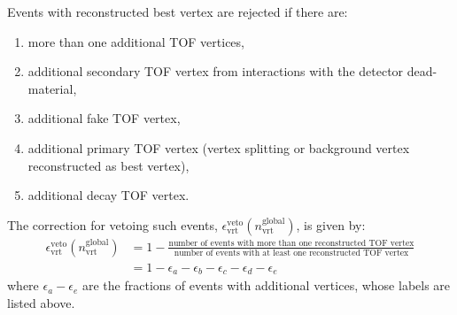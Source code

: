Events with reconstructed best vertex are rejected if there  are:
\begin{enumerate}[label=\alph*)]
	\item more than one additional TOF vertices,
	\item additional secondary TOF vertex from interactions with the detector dead-material,
	\item additional fake TOF vertex,
	\item additional primary TOF vertex (vertex splitting or background vertex reconstructed as best vertex),
	\item additional decay TOF vertex.  
\end{enumerate}
The correction for vetoing such events, $\epsilon_\textrm{vrt}^\textrm{veto}\left(n_\textrm{vrt}^\textrm{global}\right)$, is given by: 
\begin{equation}
\begin{split}
\epsilon_\textrm{vrt}^\textrm{veto}\left(n_\textrm{vrt}^\textrm{global}\right) & =1-\frac{\textrm{number of events with more than one reconstructed  TOF vertex}}{\textrm{number of events with at least one reconstructed TOF vertex}} \\
& =1-\epsilon_a-\epsilon_b-\epsilon_c-\epsilon_d-\epsilon_e
\end{split}
\end{equation}
where $\epsilon_a-\epsilon_e$ are the fractions of events with additional vertices, whose labels  are listed above.%

